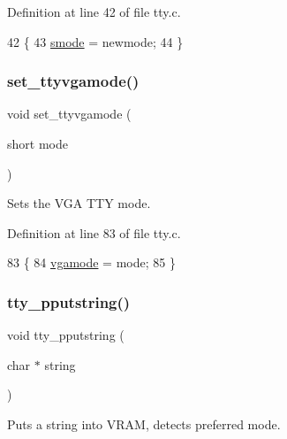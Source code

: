Definition at line 42 of file tty.\+c.


\begin{DoxyCode}
42                                   \{
43     \hyperlink{a00173_a22b8d30f7aee33f172c1239aed53e7db_a22b8d30f7aee33f172c1239aed53e7db}{smode} = newmode;
44 \}
\end{DoxyCode}
\mbox{\label{a00173_aaf55ee008e2e63ca97eacae371646db7_aaf55ee008e2e63ca97eacae371646db7}} 
\subsubsection{\texorpdfstring{set\+\_\+ttyvgamode()}{set\_ttyvgamode()}}
{\footnotesize\ttfamily void set\+\_\+ttyvgamode (\begin{DoxyParamCaption}\item[{short}]{mode }\end{DoxyParamCaption})}



Sets the V\+GA T\+TY mode. 



Definition at line 83 of file tty.\+c.


\begin{DoxyCode}
83                                 \{
84     \hyperlink{a00173_af93b0649fdd1bea5b6d29ed37205aa2c_af93b0649fdd1bea5b6d29ed37205aa2c}{vgamode} = mode;
85 \}
\end{DoxyCode}
\mbox{\label{a00173_ade960b1320324706aac6c00cc6b1b2fe_ade960b1320324706aac6c00cc6b1b2fe}} 
\subsubsection{\texorpdfstring{tty\+\_\+pputstring()}{tty\_pputstring()}}
{\footnotesize\ttfamily void tty\+\_\+pputstring (\begin{DoxyParamCaption}\item[{char $\ast$}]{string }\end{DoxyParamCaption})}



Puts a string into V\+R\+AM, detects preferred mode. 


